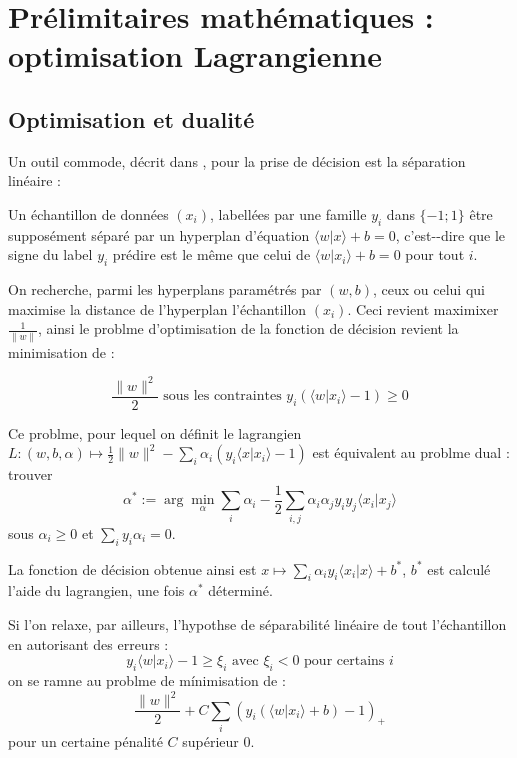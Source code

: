 \section{Pr\'elimitaires math\'ematiques : optimisation Lagrangienne}

\subsection{Optimisation et dualit\'e}

Un outil commode, d\'ecrit dans \cite{Lj}, pour la prise de d\'ecision est la s\'eparation lin\'eaire :

\par
Un \'echantillon de donn\'ees $(x_i)$, labell\'ees par une famille $y_i$ dans $\{-1;1\}$ %
\^etre suppos\'ement s\'epar\'e par un hyperplan d'\'equation $\langle w|x\rangle+b=0$, %
c'est--dire que le signe du label $y_i$  pr\'edire est le m\^eme que celui de $\langle w|x_i\rangle+b=0$ pour tout $i$.

\par
On recherche, parmi les hyperplans param\'etr\'es par $(w,b)$, ceux ou celui qui maximise la distance de l'hyperplan  l'\'echantillon $(x_i)$. %
Ceci revient  maximixer $\frac{1}{\|w\|}$, ainsi le problme d'optimisation de la fonction de d\'ecision revient  la minimisation de :

\[\frac{\|w\|^2}{2}\text{ sous les contraintes }y_i(\langle w|x_i\rangle -1)\geq 0\]

Ce problme, pour lequel on d\'efinit le lagrangien %
$L:(w,b,\alpha)\mapsto\frac{1}{2}\|w\|^2-\sum\limits_i \alpha_i(y_i\langle x|x_i\rangle-1)$ %
est \'equivalent au problme dual : trouver
\[\alpha^{\ast}:=\arg\min\limits_{\alpha}\sum\limits_i\alpha_i-\frac{1}{2}\sum\limits_{i,j}\alpha_i\alpha_jy_iy_j\langle x_i|x_j\rangle\]
sous $\alpha_i\geq 0$ et $\sum\limits_i y_i\alpha_i=0$.

\par
La fonction de d\'ecision obtenue ainsi est $x\mapsto\sum_i\alpha_iy_i\langle x_i|x\rangle+b^{\ast}$, %
$b^{\ast}$ est calcul\'e  l'aide du lagrangien, une fois $\alpha^{\ast}$ d\'etermin\'e.

\par
Si l'on relaxe, par ailleurs, l'hypothse de s\'eparabilit\'e lin\'eaire de tout l'\'echantillon en autorisant des erreurs :
\[y_i\langle w|x_i\rangle -1\geq\xi_i\text{ avec }\xi_i<0\text{ pour certains }i\]
on se ramne au problme de m\'inimisation de :
\[\frac{\|w\|^2}{2}+C\sum\limits_i(y_i(\langle w|x_i\rangle +b)-1)_+\]
pour un certaine p\'enalit\'e $C$ sup\'erieur  $0$.

